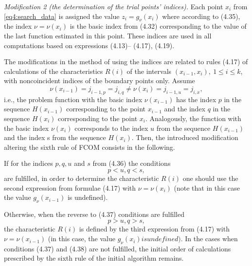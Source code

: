 \emph{Modification 2 (the determination of the trial points’ indices).} Each point $x_i$ from \eqref{eq4:search_data} is assigned the value $z_i=g_\nu(x_i)$ where according to (4.35), the index $\nu=\nu(x_i)$ is the basic index from (4.32) corresponding to the value of the last function estimated in this point. These indices are used in all computations based on expressions (4.13)– (4.17), (4.19).

The modifications in the method of using the indices are related to rules (4.17) of calculations of the characteristics $R(i)$ of the intervals $(x_{i-1},x_i),\: 1\le i\le k$, with noncoincident
indices of the boundary points only. Assume
\begin{equation}
  \nu(x_{i-1})=j_{i-1,p}=j_{i,q}\not=\nu(x_i)=j_{i-1,u}=j_{i,x},
\end{equation}
i.e., the problem function with the basic index $\nu(x_{i-1})$ has the index $p$ in the sequence $H(x_{i-1})$ corresponding to the point $x_{i-1}$ and the index $q$ in the sequence $H(x_i)$ corresponding to the point $x_i$. Analogously, the function with the basic index $\nu(x_i)$ corresponds to the index $u$ from the sequence $H(x_{i-1})$ and the index s from the sequence $H(x_i)$. Then, the introduced modification altering the sixth rule of FCOM consists in the following.

If for the indices $p,q, u$ and $s$ from (4.36) the conditions
\begin{equation}
  p<u,q<s,
\end{equation}
are fulfilled, in order to determine the characteristic $R(i)$ one should use the second expression from formulae (4.17) with $\nu=\nu(x_i)$ (note that in this case the value $g_\nu(x_{i-1})$ is undefined).

Otherwise, when the reverse to (4.37) conditions are fulfilled
\begin{equation}
  p>u,q>s,
\end{equation}
the characteristic $R(i)$ is defined by the third expression from (4.17) with $\nu=\nu(x_{i-1})$ (in this
case, the value $g_\nu(x_i ) is undefined)$. In the cases when conditions (4.37) and (4.38) are not fulfilled, the initial order of calculations prescribed by the sixth rule of the initial algorithm remains.

